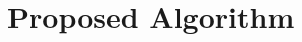 \documentclass{article}
\begin{document}
\section{Proposed Algorithm}
\label{sec:proposed_method}


\end{document}
